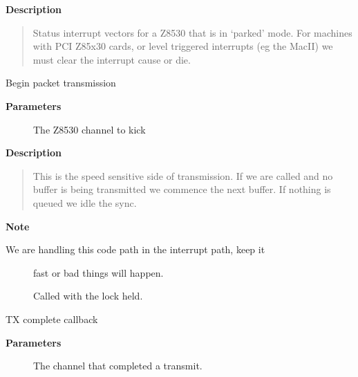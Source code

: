 \documentclass[a4paper,8pt,english]{sphinxmanual}
\begin{document}
\textbf{Description}
\begin{quote}

Status interrupt vectors for a Z8530 that is in `parked' mode.
For machines with PCI Z85x30 cards, or level triggered interrupts
(eg the MacII) we must clear the interrupt cause or die.
\end{quote}

\begin{fulllineitems}
\label{networking/z8530book:c.z8530_tx_begin}
Begin packet transmission

\end{fulllineitems}


\textbf{Parameters}
\begin{description}
\item[{}] \leavevmode
The Z8530 channel to kick

\end{description}

\textbf{Description}
\begin{quote}

This is the speed sensitive side of transmission. If we are called
and no buffer is being transmitted we commence the next buffer. If
nothing is queued we idle the sync.
\end{quote}

\textbf{Note}
\begin{description}
\item[{We are handling this code path in the interrupt path, keep it}] \leavevmode
fast or bad things will happen.

Called with the lock held.

\end{description}

\begin{fulllineitems}
\label{networking/z8530book:c.z8530_tx_done}
TX complete callback

\end{fulllineitems}


\textbf{Parameters}
\begin{description}
\item[{}] \leavevmode
The channel that completed a transmit.

\end{description}
\end{document}
